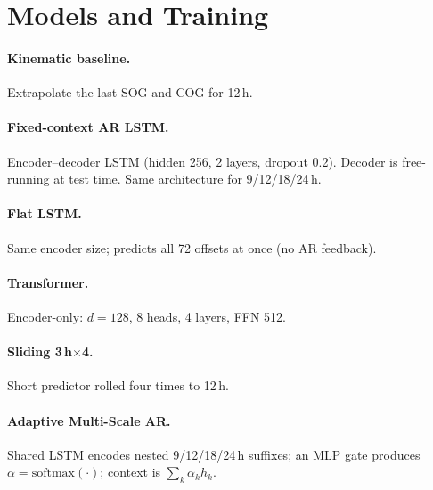\documentclass[11pt,a4paper]{article}
\begin{document}
\section{Models and Training}
\vspace{-0.25em}
\paragraph{Kinematic baseline.} Extrapolate the last SOG and COG for 12\,h.
\paragraph{Fixed-context AR LSTM.} Encoder--decoder LSTM (hidden 256, 2 layers, dropout 0.2). Decoder is free-running at test time. Same architecture for 9/12/18/24\,h.
\paragraph{Flat LSTM.} Same encoder size; predicts all 72 offsets at once (no AR feedback).
\paragraph{Transformer.} Encoder-only: \(d{=}128\), 8 heads, 4 layers, FFN 512.
\paragraph{Sliding 3\,h\(\times\)4.} Short predictor rolled four times to 12\,h.
\paragraph{Adaptive Multi-Scale AR.} Shared LSTM encodes nested 9/12/18/24\,h suffixes; an MLP gate produces \(\alpha=\mathrm{softmax}(\cdot)\); context is \(\sum_k\alpha_k h_k\).
\end{document}
